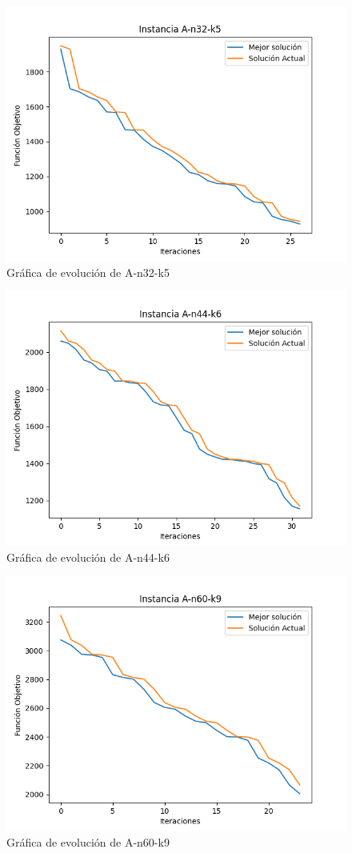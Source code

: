 \documentclass[12pt]{article}
\begin{document}
	\begin{figure}[H]
		\centering
		\caption{Gráfica de evolución de A-n32-k5}
		\includegraphics[scale=0.5,width=12cm]{n32-k5.png}
	\end{figure}

	\begin{figure}[H]
		\centering
		\caption{Gráfica de evolución de A-n44-k6}
		\includegraphics[scale=0.5,width=12cm]{n44-k6.png}
	\end{figure}
	\begin{figure}[H]
		\centering
		\caption{Gráfica de evolución de A-n60-k9}
		\includegraphics[scale=0.5,width=12cm]{n60-k9.png}
	\end{figure}
	
\end{document}
